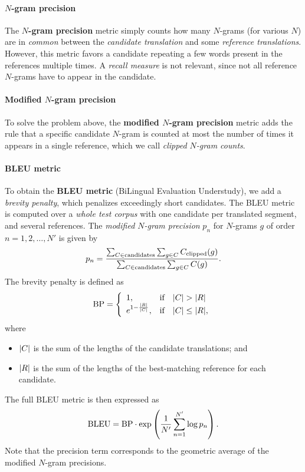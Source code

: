 \paragraph{\(N\)-gram precision}
The \textbf{\(N\)-gram precision} metric simply counts how many \(N\)-grams (for various \(N\)) are in \emph{common} between the \emph{candidate translation} and some \emph{reference translations}.
However, this metric favors a candidate repeating a few words present in the references multiple times.
A \emph{recall measure} is not relevant, since not all reference \(N\)-grams have to appear in the candidate.

\paragraph{Modified \(N\)-gram precision}
To solve the problem above, the \textbf{modified \(N\)-gram precision} metric adds the rule that a specific candidate \(N\)-gram is counted at most the number of times it appears in a single reference, which we call \emph{clipped \(N\)-gram counts}.

\paragraph{BLEU metric}
To obtain the \textbf{BLEU metric} (BiLingual Evaluation Understudy), we add a \emph{brevity penalty}, which penalizes exceedingly short candidates.
The BLEU metric is computed over a \emph{whole test corpus} with one candidate per translated segment, and several references.
The \emph{modified \(N\)-gram precision} \(p_n\) for \(N\)-grams \(g\) of order \(n = 1, 2, \dots, N'\) is given by
\[
p_n = \frac{\sum_{C \in \textnormal{candidates}} \sum_{g \in C} C_\textnormal{clipped}(g)}{\sum_{C \in \textnormal{candidates}} \sum_{g \in C} C(g)}.
\]
The brevity penalty is defined as
\[
\textnormal{BP} = \left\{\begin{array}{l@{\quad}l}
1, & \textnormal{if} \quad \abs{C} > \abs{R} \\
e^{1 - \frac{\abs{R}}{\abs{C}}}, & \textnormal{if} \quad \abs{C} \leq \abs{R},
\end{array}\right.
\]
where
\begin{itemize}
	\item \({\left\lvert C\right\lvert}\) is the sum of the lengths of the candidate translations; and
	\item \({\left\lvert R\right\lvert}\) is the sum of the lengths of the best-matching reference for each candidate.
\end{itemize}
The full BLEU metric is then expressed as
\[
\textnormal{BLEU} = \textnormal{BP} \cdot \exp\left(\frac{1}{N'} \sum_{n = 1}^{N'} \log p_n\right).
\]
Note that the precision term corresponds to the geometric average of the modified \(N\)-gram precisions.